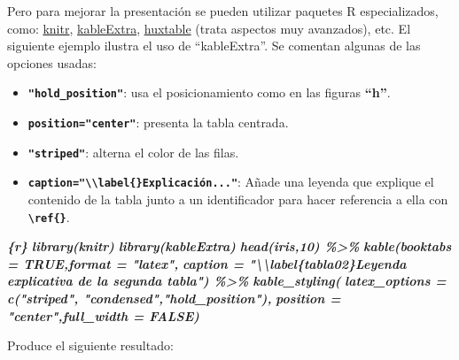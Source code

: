 \documentclass[12pt,a4paper,]{book}
\newenvironment{Shaded}{\begin{snugshade}}{\end{snugshade}}
\newcommand{\InformationTok}[1]{\textcolor[rgb]{0.56,0.35,0.01}{\textbf{\textit{#1}}}}
\providecommand{\tightlist}{%
  \setlength{\itemsep}{0pt}\setlength{\parskip}{0pt}}
\numberwithin{dummy}{section}
\theoremstyle{ocrenumbox}
\theoremstyle{blacknumex}
\theoremstyle{blacknumbox}
\theoremstyle{ocrenum}
\theoremstyle{ocrenum}
\begin{document}
Pero para mejorar la presentación se pueden utilizar paquetes R
especializados, como:
\href{https://cran.r-project.org/web/packages/knitr/index.html}{knitr},
\href{https://cran.r-project.org/web/packages/kableExtra/index.html}{kableExtra},
\href{https://cran.r-project.org/web/packages/huxtable/}{huxtable}
(trata aspectos muy avanzados), etc. El siguiente ejemplo ilustra el uso
de ``kableExtra''. Se comentan algunas de las opciones usadas:

\begin{itemize}
\tightlist
\item
  \textbf{\texttt{"hold\_position"}}: usa el posicionamiento como en las
  figuras \textbf{``h''}.
\item
  \textbf{\texttt{position="center"}}: presenta la tabla centrada.
\item
  \textbf{\texttt{"striped"}}: alterna el color de las filas.
\item
  \textbf{\texttt{caption="\textbackslash{}\textbackslash{}label\{\}Explicación..."}}:
  Añade una leyenda que explique el contenido de la tabla junto a un
  identificador para hacer referencia a ella con
  \textbf{\texttt{\textbackslash{}ref\{\}}}.
\end{itemize}

\begin{Shaded}
\begin{Highlighting}[]
\InformationTok{\textasciigrave{}\textasciigrave{}\textasciigrave{}\{r\}}
\InformationTok{library(knitr)}
\InformationTok{library(kableExtra) }
\InformationTok{head(iris,10) \%\textgreater{}\%}
\InformationTok{ kable(booktabs = TRUE,format = "latex",}
\InformationTok{  caption = "\textbackslash{}\textbackslash{}label\{tabla02\}Leyenda explicativa de la segunda tabla") \%\textgreater{}\%}
\InformationTok{ kable\_styling(}
\InformationTok{  latex\_options = c("striped", "condensed","hold\_position"), }
\InformationTok{  position = "center",full\_width = FALSE)}
\InformationTok{\textasciigrave{}\textasciigrave{}\textasciigrave{}}
\end{Highlighting}
\end{Shaded}

Produce el siguiente resultado:
\end{document}
